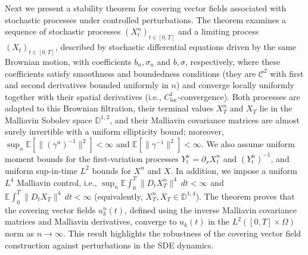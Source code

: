\documentclass[]{interact}
\newcommand{\1}{\mathbf{1}}
\theoremstyle{plain}%
\theoremstyle{definition}
\theoremstyle{remark}
\numberwithin{equation}{section}
\begin{document}
Next we present a stability theorem for covering vector fields associated with stochastic processes under controlled perturbations. The theorem examines a sequence of stochastic processes \( (X_t^n)_{t \in [0, T]} \) and a limiting process \( (X_t)_{t \in [0, T]} \), described by stochastic differential equations driven by the same Brownian motion, with coefficients \( b_n, \sigma_n \) and \( b, \sigma \), respectively, where these coefficients satisfy smoothness and boundedness conditions (they are \( \mathcal{C}^2 \) with first and second derivatives bounded uniformly in \(n\)) and converge locally uniformly together with their spatial derivatives (i.e., \(C^1_{\mathrm{loc}}\)-convergence). Both processes are adapted to this Brownian filtration, their terminal values \(X_T^n\) and \(X_T\) lie in the Malliavin Sobolev space \( \mathbb{D}^{1,2} \), and their Malliavin covariance matrices are almost surely invertible with a uniform ellipticity bound; moreover, \(\sup_n \mathbb{E}\!\left[\|(\gamma^n)^{-1}\|^2\right]<\infty\) and \(\mathbb{E}\!\left[\|\gamma^{-1}\|^2\right]<\infty\). We also assume uniform moment bounds for the first-variation processes \(Y_t^n=\partial_x X_t^n\) and \((Y_t^n)^{-1}\), and uniform sup-in-time \(L^2\) bounds for \(X^n\) and \(X\). In addition, we impose a uniform \(L^4\) Malliavin control, i.e., \(\sup_n \mathbb{E}\!\int_0^T \|D_t X_T^n\|^4\,dt < \infty\) and \(\mathbb{E}\!\int_0^T \|D_t X_T\|^4\,dt < \infty\) (equivalently, \(X_T^n,X_T\in\mathbb{D}^{1,4}\)). The theorem proves that the covering vector fields \( u_k^n(t) \), defined using the inverse Malliavin covariance matrices and Malliavin derivatives, converge to \( u_k(t) \) in the \( L^2([0, T] \times \Omega) \) norm as \( n \to \infty \). This result highlights the robustness of the covering vector field construction against perturbations in the SDE dynamics.
\end{document}
